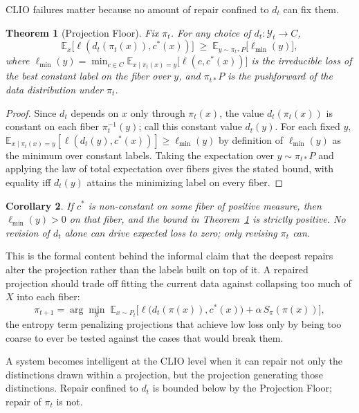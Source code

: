 \documentclass[11pt]{article}
\theoremstyle{plain}
\newtheorem{theorem}{Theorem}[section]
\newtheorem{corollary}[theorem]{Corollary}
\theoremstyle{definition}
\theoremstyle{remark}
\begin{document}
CLIO failures matter because no amount of repair confined to $d_t$ can fix them.

\begin{theorem}[Projection Floor]
\label{thm:floor}
Fix $\pi_t$. For any choice of $d_t : \mathcal{Y}_t \to C$,
\[
\mathbb{E}_x\big[\ell(d_t(\pi_t(x)), c^\ast(x))\big] \;\ge\; \mathbb{E}_{y \sim \pi_{t\ast}P}\big[\ell_{\min}(y)\big],
\]
where $\ell_{\min}(y) = \min_{c \in C} \mathbb{E}_{x \mid \pi_t(x)=y}\big[\ell(c, c^\ast(x))\big]$ is the irreducible loss of the best constant label on the fiber over $y$, and $\pi_{t\ast}P$ is the pushforward of the data distribution under $\pi_t$.
\end{theorem}
\begin{proof}
Since $d_t$ depends on $x$ only through $\pi_t(x)$, the value $d_t(\pi_t(x))$ is constant on each fiber $\pi_t^{-1}(y)$; call this constant value $d_t(y)$. For each fixed $y$, $\mathbb{E}_{x\mid \pi_t(x)=y}[\ell(d_t(y), c^\ast(x))] \ge \ell_{\min}(y)$ by definition of $\ell_{\min}(y)$ as the minimum over constant labels. Taking the expectation over $y \sim \pi_{t\ast}P$ and applying the law of total expectation over fibers gives the stated bound, with equality iff $d_t(y)$ attains the minimizing label on every fiber.
\end{proof}

\begin{corollary}
If $c^\ast$ is non-constant on some fiber of positive measure, then $\ell_{\min}(y) > 0$ on that fiber, and the bound in Theorem~\ref{thm:floor} is strictly positive. No revision of $d_t$ alone can drive expected loss to zero; only revising $\pi_t$ can.
\end{corollary}

This is the formal content behind the informal claim that the deepest repairs alter the projection rather than the labels built on top of it. A repaired projection should trade off fitting the current data against collapsing too much of $X$ into each fiber:
\begin{equation}
\pi_{t+1} = \arg\min_{\pi} \; \mathbb{E}_{x \sim P_t}\Big[\ell\big(d_t(\pi(x)), c^\ast(x)\big) + \alpha\, S_{\pi}(\pi(x))\Big],
\label{eq:clio-repair}
\end{equation}
the entropy term penalizing projections that achieve low loss only by being too coarse to ever be tested against the cases that would break them.

\begin{tcolorbox}[title=Projection Repair Principle]
A system becomes intelligent at the CLIO level when it can repair not only the distinctions drawn within a projection, but the projection generating those distinctions. Repair confined to $d_t$ is bounded below by the Projection Floor; repair of $\pi_t$ is not.
\end{tcolorbox}
\end{document}
